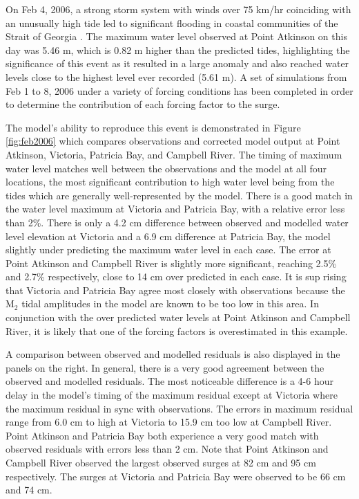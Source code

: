 \documentclass[pdftex,10pt]{article}
\begin{document}
On Feb 4, 2006, a strong storm system with winds over 75 km/hr coinciding with an unusually high tide led to significant flooding in coastal communities of the Strait of Georgia \citep{romanowski2010storm}. The maximum water level observed at Point Atkinson on this day was 5.46 m, which is 0.82 m higher than the predicted tides, highlighting the significance of this event as it resulted in a large anomaly and also reached water levels close to the highest level ever recorded (5.61 m). A set of simulations from Feb 1 to 8, 2006 under a variety of forcing conditions has been completed in order to determine the contribution of each forcing factor to the surge.

The model's ability to reproduce this event is demonstrated in Figure \ref{fig:feb2006} which compares observations and corrected model output at Point Atkinson, Victoria, Patricia Bay, and Campbell River. The timing of maximum water level matches well between the observations and the model at all four locations, the most significant contribution to high water level being from the tides which are generally well-represented by the model. There is a good match in the water level maximum at Victoria and Patricia Bay, with a relative error less than 2\%. There is only a 4.2 cm difference between observed and modelled water level elevation at Victoria and a 6.9 cm difference at Patricia Bay, the model slightly under predicting the maximum water level in each case. The error at Point Atkinson and Campbell River is slightly more significant, reaching 2.5\% and 2.7\% respectively, close to 14 cm over predicted in each case. It is sup rising that Victoria and Patricia Bay agree most closely with observations because the M$_2$ tidal amplitudes in the model are known to be too low in this area. In conjunction with the over predicted water levels at Point Atkinson and Campbell River, it is likely that one of the forcing factors is overestimated in this example. 

A comparison between observed and modelled residuals is also displayed in the panels on the right. In general, there is a very good agreement between the observed and modelled residuals. The most noticeable difference is a 4-6 hour delay in the model's timing of the maximum residual except at Victoria where the maximum residual in sync with observations. The errors in maximum residual range from 6.0 cm to high at Victoria to 15.9 cm too low at Campbell River. Point Atkinson and Patricia Bay both experience a very good match with observed residuals with errors less than 2 cm. Note that Point Atkinson and Campbell River observed the largest observed surges at 82 cm and 95 cm respectively. The surges at Victoria and Patricia Bay were observed to be 66 cm and 74 cm. 
\end{document}
